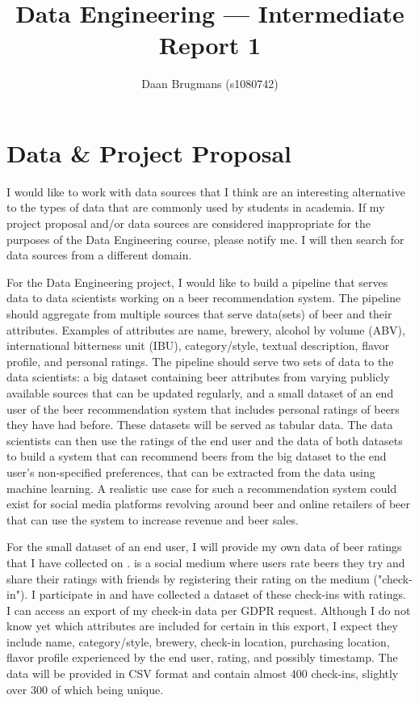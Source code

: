 \documentclass[sigconf, natbib=true]{acmart}
\begin{document}
\title{Data Engineering --- Intermediate Report 1}

\author{Daan Brugmans (s1080742)}

\maketitle

\section{Data \& Project Proposal}
I would like to work with data sources that I think are an interesting alternative to the types of data that are commonly used by students in academia.
If my project proposal and/or data sources are considered inappropriate for the purposes of the Data Engineering course, please notify me. 
I will then search for data sources from a different domain.

For the Data Engineering project, I would like to build a pipeline that serves data to data scientists working on a beer recommendation system.
The pipeline should aggregate from multiple sources that serve data(sets) of beer and their attributes.
Examples of attributes are name, brewery, alcohol by volume (ABV), international bitterness unit (IBU), category/style, textual description, flavor profile, and personal ratings.
The pipeline should serve two sets of data to the data scientists: a big dataset containing beer attributes from varying publicly available sources that can be updated regularly, and a small dataset of an end user of the beer recommendation system that includes personal ratings of beers they have had before.
These datasets will be served as tabular data.
The data scientists can then use the ratings of the end user and the data of both datasets to build a system that can recommend beers from the big dataset to the end user's non-specified preferences, that can be extracted from the data using machine learning.
A realistic use case for such a recommendation system could exist for social media platforms revolving around beer and online retailers of beer that can use the system to increase revenue and beer sales.

For the small dataset of an end user, I will provide my own data of beer ratings that I have collected on \citeauthor{untappd}.
\citet{untappd} is a social medium where users rate beers they try and share their ratings with friends by registering their rating on the medium ("check-in").
I participate in \citeauthor{untappd} and have collected a dataset of these check-ins with ratings.
I can access an export of my check-in data per GDPR request.
Although I do not know yet which attributes are included for certain in this export, I expect they include name, category/style, brewery, check-in location, purchasing location, flavor profile experienced by the end user, rating, and possibly timestamp.
The data will be provided in CSV format and contain almost 400 check-ins, slightly over 300 of which being unique.
\end{document}
